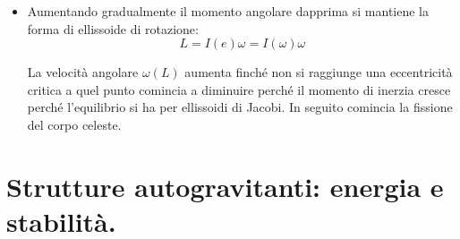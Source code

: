 \documentclass[11pt,a4paper]{article}
\begin{document}
\begin{itemize}
\item Aumentando gradualmente il momento angolare dapprima si mantiene la forma di ellissoide di rotazione:
\begin{equation}
L = I(e) \omega = I(\omega) \omega
\end{equation}

La velocità angolare $\omega(L)$ aumenta finché non si raggiunge una eccentricità critica a quel punto comincia a diminuire perché il momento di inerzia cresce perché l'equilibrio si ha per ellissoidi di Jacobi. In seguito comincia la fissione del corpo celeste.
\end{itemize}

\section{Strutture autogravitanti: energia e stabilità.}
\end{document}
